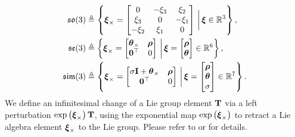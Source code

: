 \begin{gather}
\label{eq:LieAlgebras}
\begin{aligned}
\mathfrak{so}(3) &\triangleq \crl{\bfxi_\times = \begin{bmatrix}0 & -\xi_3 & \xi_2\\\xi_3 & 0 & -\xi_1\\-\xi_2 & \xi_1 & 0 \end{bmatrix} \,\bigg\vert\, \bfxi \in \bbR^3},\\
\mathfrak{se}(3) &\triangleq \crl{\bfxi_\times = \begin{bmatrix} \bftheta_\times & \bfrho \\ \mathbf{0}^\top & 0 \end{bmatrix}\,\bigg\vert\, \bfxi = \begin{bmatrix} \bfrho \\ \bftheta\end{bmatrix} \in \bbR^6},\\
\mathfrak{sim}(3) &\triangleq \crl{\bfxi_\times = \begin{bmatrix} \sigma \bfI + \bftheta_\times & \bfrho \\ \mathbf{0}^\top & 0 \end{bmatrix} \,\bigg\vert\, \bfxi = \begin{bmatrix} \bfrho \\ \bftheta \\ \sigma \end{bmatrix} \in \bbR^7}.
\end{aligned}
\raisetag{12ex}
\end{gather}
%
We define an infinitesimal change of a Lie group element $\mathbf{T}$ via a left perturbation $\exp\left(\boldsymbol{\xi}_\times\right)\mathbf{T}$, using the exponential map $\exp\left(\boldsymbol{\xi}_\times\right)$ to retract a Lie algebra element $\boldsymbol{\xi}_\times$ to the Lie group. Please refer to \cite[Ch.7]{BarfootBook} or \cite{Gao2017SLAM} for details. 

